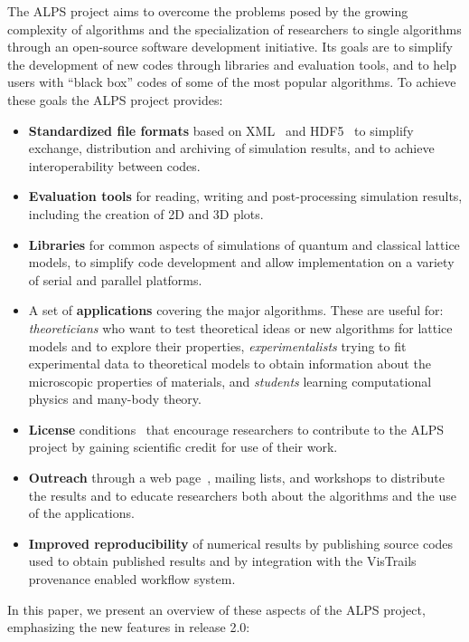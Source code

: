 \documentclass[12pt]{iopart}
\begin{document}
The ALPS project aims to
overcome the problems posed by the growing complexity of algorithms
and the specialization of researchers to single algorithms through
an open-source software development initiative. Its goals are to simplify the development of new codes through libraries and evaluation tools, and to help users with ``black box'' codes of some of the most popular algorithms. To achieve these goals the ALPS project provides:
\begin{itemize}
\item {\bf Standardized file formats} based on XML~\cite{xml} and HDF5~\cite{hdf5} to simplify exchange,
distribution and archiving of simulation results, and to achieve
interoperability between codes.

\item {\bf Evaluation tools} for reading, writing and post-processing simulation results, including the creation of 2D and 3D plots.

\item {\bf Libraries} for common aspects of
simulations of quantum and classical lattice models, to simplify code
development and allow implementation on a variety of serial and parallel platforms.
\item A set of {\bf applications} covering the major algorithms. These are useful for: 
{\it theoreticians} who want to test theoretical ideas or new algorithms for
lattice models and to explore their properties, 
{\it experimentalists} trying to fit experimental data to theoretical
models to obtain information about the microscopic properties of
materials, and {\it students} learning computational physics and many-body theory.
\item{\bf License} conditions~\cite{librarylicense,applicationlicense} that encourage researchers to contribute
to the ALPS project by gaining scientific credit for use of their
work.
\item {\bf Outreach} through a web page~\cite{alps}, mailing lists, and
workshops to distribute the results and to educate researchers both
about the algorithms and the use of the applications.
\item {\bf Improved reproducibility} of numerical results by
publishing source codes used to obtain published results and by integration with the VisTrails~\cite{vistrails} provenance enabled workflow system.
\end{itemize}


 In this paper, we present an overview of these
 aspects of the ALPS project, emphasizing the new features in release 2.0:
 
\end{document}
